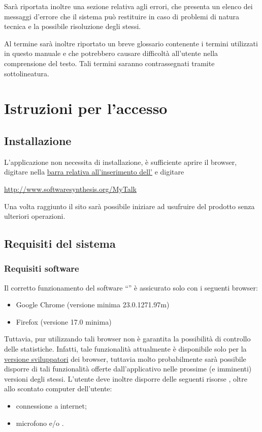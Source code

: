 Sarà riportata inoltre una sezione relativa agli errori, che presenta un elenco dei messaggi d'errore che il sistema può restituire in caso di problemi di natura tecnica e la possibile risoluzione degli stessi. 

Al termine sarà inoltre riportato un breve glossario contenente i termini utilizzati in questo manuale e che potrebbero causare difficoltà all'utente nella comprensione del testo. Tali termini saranno contrassegnati tramite sottolineatura. 

\section{Istruzioni per l'accesso}

\subsection{Installazione}
L'applicazione non necessita di installazione, è sufficiente aprire il browser, digitare nella \underline{barra relativa all'inserimento dell'} e digitare
\begin{center}
 \url{http://www.softwaresynthesis.org/MyTalk}
\end{center}
Una volta raggiunto il sito sarà possibile iniziare ad usufruire del prodotto senza ulteriori operazioni.

\subsection{Requisiti del sistema}
\subsubsection{Requisiti software}
Il corretto funzionamento del software  ``\caName'' è assicurato solo con i seguenti browser:
\begin{itemize}
  \item Google Chrome (versione minima 23.0.1271.97m)
  \item Firefox (versione 17.0 minima)
\end{itemize}

Tuttavia, pur utilizzando tali browser non è garantita la possibilità di controllo delle statistiche. Infatti, tale funzionalità attualmente è disponibile solo per la \underline{versione sviluppatori} dei browser, tuttavia molto probabilmente sarà possibile disporre di tali funzionalità offerte dall'applicativo nelle prossime (e imminenti) versioni degli stessi.
L'utente deve inoltre disporre delle seguenti risorse , oltre allo scontato computer dell'utente:
\begin{itemize}
  \item connessione a internet;
  \item microfono e/o  .
 \end{itemize}

